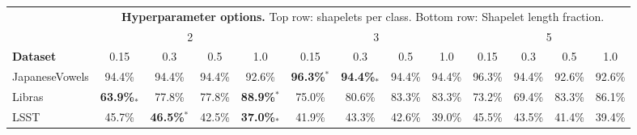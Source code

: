 \begin{tabular}{lcccccccccccc}
\toprule
& \multicolumn{12}{c}{\textbf{Hyperparameter options.} Top row: shapelets per class. Bottom row: Shapelet length fraction.}\\
{} & \multicolumn{4}{c}{{2}}    & \multicolumn{4}{c}{{3}}    & \multicolumn{4}{c}{{5}}  \\
\cmidrule(lr){2-5} \cmidrule(lr){6-9} \cmidrule(lr){10-13}
\textbf{Dataset}          & 0.15   & 0.3    & 0.5    & 1.0    & 0.15   & 0.3    & 0.5    & 1.0    & 0.15   & 0.3    & 0.5    & 1.0 \\
\midrule
JapaneseVowels            & 94.4\% & 94.4\% & 94.4\% & 92.6\% & \textbf{96.3\%}$^*$ & \textbf{94.4\%}$_*$ & 94.4\% & 94.4\% & 96.3\% & 94.4\% & 92.6\% & 92.6\% \\
Libras                    & \textbf{63.9\%}$_*$ & 77.8\% & 77.8\% & \textbf{88.9\%}$^*$ & 75.0\% & 80.6\% & 83.3\% & 83.3\% & 73.2\% & 69.4\% & 83.3\% & 86.1\% \\
LSST                      & 45.7\% & \textbf{46.5\%}$^*$ & 42.5\% & \textbf{37.0\%}$_*$ & 41.9\% & 43.3\% & 42.6\% & 39.0\% & 45.5\% & 43.5\% & 41.4\% & 39.4\% \\
\bottomrule
\end{tabular}
